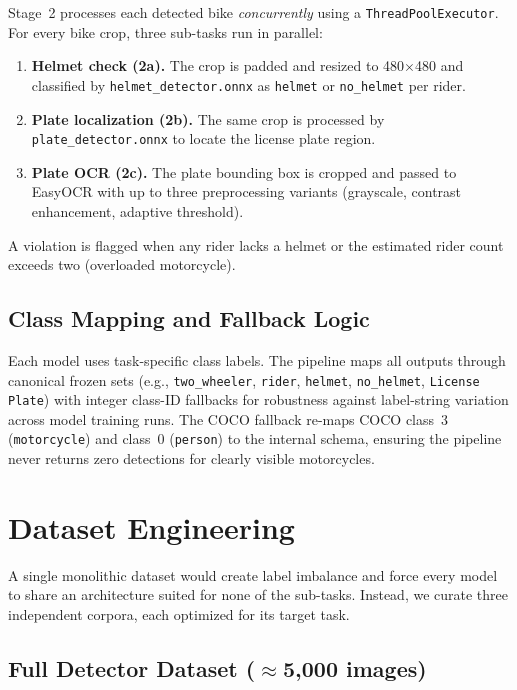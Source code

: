 \documentclass[10pt,twocolumn]{article}
\begin{document}
Stage~2 processes each detected bike \textit{concurrently} using a
\texttt{ThreadPoolExecutor}. For every bike crop, three sub-tasks run in
parallel:

\begin{enumerate}
  \item \textbf{Helmet check (2a).} The crop is padded and resized to
        480$\times$480 and classified by \texttt{helmet\_detector.onnx} as
        \texttt{helmet} or \texttt{no\_helmet} per rider.
  \item \textbf{Plate localization (2b).} The same crop is processed by
        \texttt{plate\_detector.onnx} to locate the license plate region.
  \item \textbf{Plate OCR (2c).} The plate bounding box is cropped and
        passed to EasyOCR with up to three preprocessing variants
        (grayscale, contrast enhancement, adaptive threshold).
\end{enumerate}

A violation is flagged when any rider lacks a helmet or the estimated
rider count exceeds two (overloaded motorcycle).

\subsection{Class Mapping and Fallback Logic}

Each model uses task-specific class labels. The pipeline maps all outputs
through canonical frozen sets (e.g., \texttt{two\_wheeler}, \texttt{rider},
\texttt{helmet}, \texttt{no\_helmet}, \texttt{License Plate}) with integer
class-ID fallbacks for robustness against label-string variation across
model training runs. The COCO fallback re-maps COCO class~3 (\texttt{motorcycle})
and class~0 (\texttt{person}) to the internal schema, ensuring the pipeline
never returns zero detections for clearly visible motorcycles.

\section{Dataset Engineering}

A single monolithic dataset would create label imbalance and force
every model to share an architecture suited for none of the sub-tasks.
Instead, we curate three independent corpora, each optimized for
its target task.

\subsection{Full Detector Dataset ($\approx$5{,}000 images)}
\end{document}
